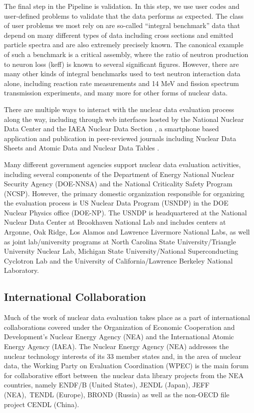 \documentclass[letterpaper]{ar-1col}
\begin{document}
The final step in the Pipeline is validation.  In this step, we use user codes and user-defined problems to validate that the data performs as expected.  The class of user problems we most rely on are so-called “integral benchmark” data that depend on many different types of data including cross sections and emitted particle spectra and are also extremely precisely known.  The canonical example of such a benchmark is a critical assembly, where the ratio of neutron production to neuron loss (k­eff) is known to several significant figures.  However, there are many other kinds of integral benchmarks used to test neutron interaction data alone, including reaction rate measurements and 14 MeV and fission spectrum transmission experiments, and many more for other forms of nuclear data.

There are multiple ways to interact with the nuclear data evaluation process along the way, including through web interfaces hosted by the National Nuclear Data Center \cite{NNDC} and the IAEA Nuclear Data Section \cite{IAEA-NDS}, a smartphone based application \cite{IAEA-APP} and publication in peer-reviewed journals including Nuclear Data Sheets \cite{NDS} and Atomic Data and Nuclear Data Tables \cite{ATNDT}.  

Many different government agencies support nuclear data evaluation activities, including several components of the Department of Energy National Nuclear Security Agency (DOE-NNSA) and the National Criticality Safety Program (NCSP).  However, the primary domestic organization responsible for organizing the evaluation process is US Nuclear Data Program (USNDP) in the DOE Nuclear Physics office (DOE-NP).  The USNDP is headquartered at the National Nuclear Data Center at Brookhaven National Lab and includes centers at Argonne, Oak Ridge, Los Alamos and Lawrence Livermore National Labs, as well as joint lab/university programs at North Carolina State University/Triangle University Nuclear Lab, Michigan State University/National Superconducting Cyclotron Lab and the University of California/Lawrence Berkeley National Laboratory.   


\subsection{International Collaboration}

Much of the work of nuclear data evaluation takes place as a part of international collaborations covered under the Organization of Economic Cooperation and Development’s Nuclear Energy Agency (NEA) and the International Atomic Energy Agency (IAEA).  The Nuclear Energy Agency (NEA) addresses the nuclear technology interests of its 33 member states and, in the area of nuclear data, the Working Party on Evaluation Coordination (WPEC) is the main forum for collaborative effort between the nuclear data library projects from the NEA countries, namely ENDF/B (United States), JENDL (Japan), JEFF (NEA), TENDL (Europe), BROND (Russia) as well as the non-OECD file project CENDL (China).
\end{document}
